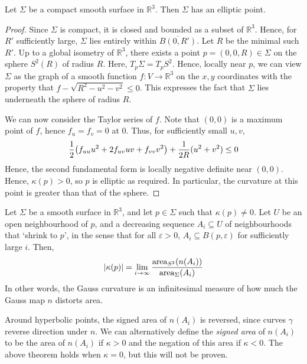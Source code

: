 \begin{proposition}
	Let \( \Sigma \) be a compact smooth surface in \( \mathbb R^3 \).
	Then \( \Sigma \) has an elliptic point.
\end{proposition}
\begin{proof}
	Since \( \Sigma \) is compact, it is closed and bounded as a subset of \( \mathbb R^3 \).
	Hence, for \( R' \) sufficiently large, \( \Sigma \) lies entirely within \( \overline{B(0,R')} \).
	Let \( R \) be the minimal such \( R' \).
	Up to a global isometry of \( \mathbb R^3 \), there exists a point \( p = (0,0,R) \in \Sigma \) on the sphere \( S^2(R) \) of radius \( R \).
	Here, \( T_p \Sigma = T_p S^2 \).
	Hence, locally near \( p \), we can view \( \Sigma \) as the graph of a smooth function \( f \colon V \to \mathbb R^3 \) on the \( x, y \) coordinates with the property that \( f - \sqrt{R^2 - u^2 - v^2} \leq 0 \).
	This expresses the fact that \( \Sigma \) lies underneath the sphere of radius \( R \).

	We can now consider the Taylor series of \( f \).
	Note that \( (0,0) \) is a maximum point of \( f \), hence \( f_u = f_v = 0 \) at \( 0 \).
	Thus, for sufficiently small \( u,v \),
	\[
		\frac{1}{2} \qty(f_{uu} u^2 + 2f_{uv} uv + f_{vv} v^2) + \frac{1}{2R} (u^2 + v^2) \leq 0
	\]
	Hence, the second fundamental form is locally negative definite near \( (0,0) \).
	Hence, \( \kappa(p) > 0 \), so \( p \) is elliptic as required.
	In particular, the curvature at this point is greater than that of the sphere.
\end{proof}
\begin{theorem}
	Let \( \Sigma \) be a smooth surface in \( \mathbb R^3 \), and let \( p \in \Sigma \) such that \( \kappa(p) \neq 0 \).
	Let \( U \) be an open neighbourhood of \( p \), and a decreasing sequence \( A_i \subseteq U \) of neighbourhoods that `shrink to \( p \)', in the sense that for all \( \varepsilon > 0 \), \( A_i \subseteq B(p,\varepsilon) \) for sufficiently large \( i \).
	Then,
	\[
		\abs{\kappa(p)} = \lim_{i \to \infty} \frac{\mathrm{area}_{S^2} (n(A_i))}{\mathrm{area}_{\Sigma} (A_i)}
	\]
	In other words, the Gauss curvature is an infinitesimal measure of how much the Gauss map \( n \) distorts area.
\end{theorem}
\begin{remark}
	Around hyperbolic points, the signed area of \( n(A_i) \) is reversed, since curves \( \gamma \) reverse direction under \( n \).
	We can alternatively define the \textit{signed area} of \( n(A_i) \) to be the area of \( n(A_i) \) if \( \kappa > 0 \) and the negation of this area if \( \kappa < 0 \).
	The above theorem holds when \( \kappa = 0 \), but this will not be proven.
\end{remark}
